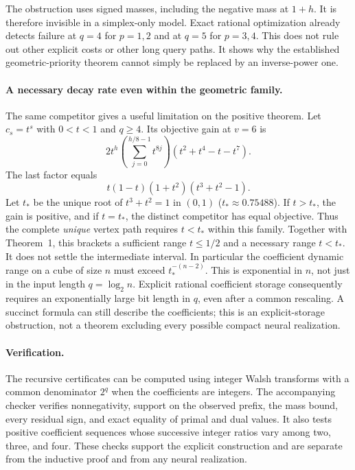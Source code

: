 \documentclass[11pt]{article}
\begin{document}
The obstruction uses signed masses, including the negative mass at
$1+h$. It is therefore invisible in a simplex-only model. Exact rational
optimization already detects failure at $q=4$ for $p=1,2$ and at $q=5$
for $p=3,4$. This does not rule out other explicit costs or other long
query paths. It shows why the established geometric-priority theorem
cannot simply be replaced by an inverse-power one.

\paragraph{A necessary decay rate even within the geometric family.}
The same competitor gives a useful limitation on the positive theorem.
Let $c_s=t^s$ with $0<t<1$ and $q\ge4$. Its objective gain at $v=6$
is
\[
 2t^h\left(\sum_{j=0}^{h/8-1}t^{8j}\right)
                          (t^2+t^4-t-t^7).
\]
The last factor equals
\[
                    t(1-t)(1+t^2)(t^3+t^2-1).
\]
Let $t_*$ be the unique root of $t^3+t^2=1$ in $(0,1)$
($t_*\approx0.75488$). If $t>t_*$, the gain is positive, and if
$t=t_*$, the distinct competitor has equal objective. Thus the complete
\emph{unique} vertex path requires $t<t_*$ within this family. Together
with Theorem~1, this brackets a sufficient range $t\le1/2$ and a
necessary range $t<t_*$. It does not settle the intermediate interval.
In particular the coefficient dynamic range on a cube of size $n$ must
exceed $t_*^{-(n-2)}$. This is exponential in $n$, not just in the input
length $q=\log_2 n$. Explicit rational coefficient storage consequently
requires an exponentially large bit length in $q$, even after a common
rescaling. A succinct formula can still describe the coefficients; this
is an explicit-storage obstruction, not a theorem excluding every
possible compact neural realization.

\paragraph{Verification.}
The recursive certificates can be computed using integer Walsh transforms
with a common denominator $2^q$ when the coefficients are integers.
The accompanying checker verifies nonnegativity, support on the observed
prefix, the mass bound, every residual sign, and exact equality of primal
and dual values. It also tests positive coefficient sequences whose
successive integer ratios vary among two, three, and four. These checks
support the explicit construction and are separate from the inductive
proof and from any neural realization.
\end{document}
